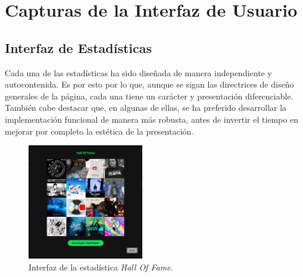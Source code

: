 \chapter{Capturas de la Interfaz de Usuario} \label{ch:anexoA}

\section{Interfaz de Estadísticas}

Cada una de las estadísticas ha sido diseñada de manera independiente y autocontenida. Es por esto por lo que, aunque se sigan las directrices de diseño generales de la página, cada una tiene un carácter y presentación diferenciable. También cabe destacar que, en algunas de ellas, se ha preferido desarrollar la implementación funcional de manera más robusta, antes de invertir el tiempo en mejorar por completo la estética de la presentación.

\begin{figure}[H]
  \centering
  \includegraphics[width=0.45\textwidth]{figures/capturas_ui/hall_of_fame.png}
  \caption{Interfaz de la estadística \textit{Hall Of Fame}.}
  \label{fig:hall_of_fame}
\end{figure}

